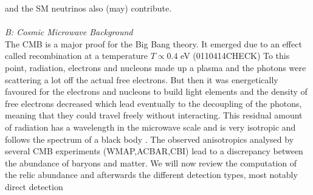 and the SM neutrinos also (may) contribute. \\
\\ \textit{B: Cosmic Microwave Background}\\
\noindent The CMB is a major proof for the Big Bang theory. It emerged due to an effect called recombination at a temperature $T\propto 0.4$ eV (0110414CHECK)
To this point, radiation, electrons and nucleons made up a plasma and the photons were scattering a lot off the actual free electrons. But then it was 
energetically favoured for the electrons and nucleons to build light elements and the density of free electrons decreased which lead eventually to the decoupling
of the photons, meaning that they could travel freely without interacting. This residual amount of radiation has a wavelength in the microwave scale and is
very isotropic and follows the spectrum of a black body \cite{DM-EvCaDo}. The observed anisotropics analysed by several CMB experiments (WMAP,ACBAR,CBI) lead to a discrepancy
between the abundance of baryons and matter. We will now review the computation of the relic abundance and afterwards the different detection types, most 
notably direct detection
